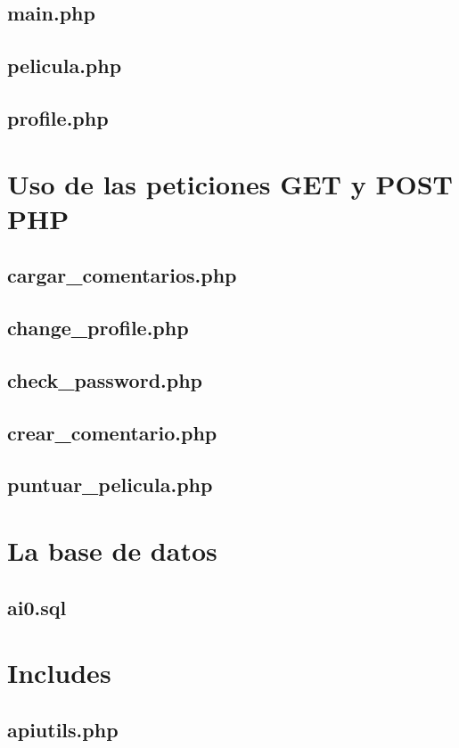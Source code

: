 \documentclass[a4paper, 12pt]{report}
\begin{document}
    \section{main.php}
    \section{pelicula.php}
    \section{profile.php}

    \chapter{Uso de las peticiones GET y POST PHP}
    \section{cargar\_comentarios.php}
    \section{change\_profile.php}
    \section{check\_password.php}
    \section{crear\_comentario.php}
    \section{puntuar\_pelicula.php}


    \chapter{La base de datos}
    \section{ai0.sql}



    \chapter{Includes}
    \section{apiutils.php}
\end{document}
